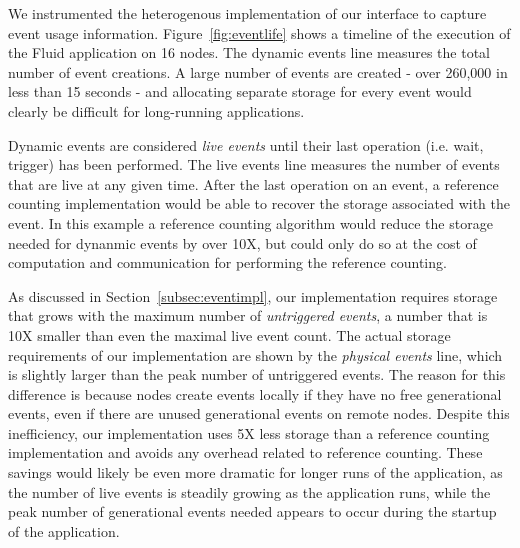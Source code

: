 We instrumented the heterogenous implementation of our interface to 
capture event usage information.  Figure~\ref{fig:eventlife} shows
a timeline of the execution of the Fluid application on 16 nodes.
The dynamic events line measures the total number of event creations.
A large number of events are created - over 260,000 in less than 15
seconds - and allocating separate storage for every event would clearly
be difficult for long-running applications.  

Dynamic events are considered {\em live events} until their last operation 
(i.e. wait, trigger) has been performed.  The live events line
measures the number of events that are live at any given time.  After
the last operation on an event, a reference counting implementation would
be able to recover the storage associated with the event.  In this example 
a reference counting algorithm would reduce the storage needed for dynanmic events
by over 10X, but could only do so at the cost of
computation and communication for performing the reference counting.  

As discussed in Section~\ref{subsec:eventimpl}, our implementation
requires storage that grows with the maximum number of {\em untriggered events}, a number
that is 10X smaller than even the maximal live event count.  The actual storage
requirements of our implementation are shown by the {\em physical events} line,
which is slightly larger than the peak number of untriggered events. 
The reason for this difference is because nodes create events locally if they have
no free generational events, even if there are unused generational events on remote nodes.
Despite this inefficiency, our implementation uses 5X less storage
than a reference counting implementation and avoids any overhead related to 
reference counting.  These savings would likely be even more dramatic for longer 
runs of the application, as the number of live events is steadily growing as the
application runs, while the peak number of generational events needed appears to 
occur during the startup of the application.



